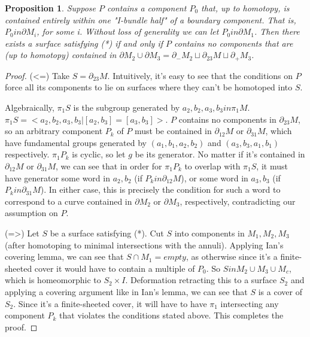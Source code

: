 \documentclass[12pt]{amsart}
\newtheorem{prop}[theorem]{Proposition}
\theoremstyle{definition}
\newcommand{\x}{\times}
\newcommand{\bd}{\partial}
\begin{document}
\begin{prop}

Suppose $P$ contains a component $P_0$ that, up to homotopy, is
contained entirely within one "I-bundle half" of a boundary component. That is,
$P_0 in \bd M_i$, for some i. Without loss of generality we can let $P_0 in
\bd M_1$. Then
there exists a surface satisfying (*) if and only if $P$ contains no components
that are (up to homotopy) contained in $\bd M_2 \cup \bd M_3 = \bd_-M_2 \sqcup
\bd_{23}M \sqcup \bd_+M_3$.

\end{prop}
\begin{proof}

(<=) Take $S=\bd_{23}M$. Intuitively, it's easy to see that the conditions on
$P$ force all its components to lie on surfaces where they can't be homotoped
into $S$.

Algebraically, $\pi_1S$ is the subgroup generated by
$a_2,b_2,a_3,b_3 in \pi_1M$. $\pi_1S = <a_2,b_2,a_3,b_3 | [a_2,b_3]=[a_3,b_3]>$. $P$ contains no
components in $\bd_{23}M$, so an arbitrary component $P_k$ of $P$  must be contained in
$\bd_{12}M$ or $\bd_{31}M$, which have fundamental groups generated by $(a_1,b_1,a_2,b_2)$ and
$(a_3,b_3,a_1,b_1)$ respectively. $\pi_1P_k$ is cyclic, so let $g$ be its generator. No
matter if it's contained in $\bd_{12}M$ or $\bd_{31}M$, we can see that in order for
$\pi_1P_k$ to
overlap with $\pi_1S$, it must have generator some word in $a_2,b_2$ (if $P_k in
\bd_{12}M$),
or some word in $a_3,b_3$ (if $P_k in \bd_{31}M$). In either case, this is precisely the
condition for such a word to correspond to a curve contained in $\bd M_2$ or $\bd M_3$,
respectively, contradicting our assumption on $P$.

(=>) Let $S$ be a surface satisfying (*). Cut $S$ into components in $M_1,M_2,M_3$
(after homotoping to minimal intersections with the annuli). Applying Ian's
covering lemma, we can see that $S \cap M_1 = empty$, as otherwise since it's
a finite-sheeted cover it would have to contain a multiple of $P_0$.
So $S in M_2 \cup M_3 \cup M_c$, which is homeomorphic to $S_2 \x I$. Deformation retracting
this to a surface $S_2$ and applying a covering argument like in Ian's lemma, we
can see that $S$ is a cover of $S_2$. Since it's a finite-sheeted cover, it will
have to have $\pi_1$ intersecting any component $P_k$ that violates the conditions
stated above. This completes the proof.

\end{proof}
\end{document}
